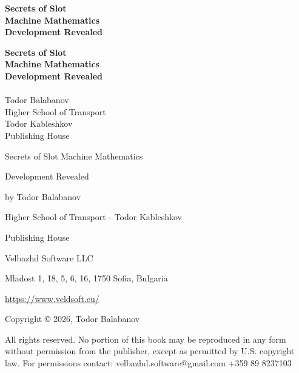 \documentclass[12pt,twoside,openany]{book}
\begin{document}
\sloppy

\frontmatter

\thispagestyle{empty}
\begin{center} \vspace*{2in} \Huge\textbf{Secrets of Slot\\ Machine Mathematics\\ Development Revealed}\\ \vspace*{0.25in} \Large\textit{} \end{center}
\clearpage

\thispagestyle{empty}
\begin{center}
    \vspace*{1in}
    \Huge\textbf{Secrets of Slot\\ Machine Mathematics\\ Development Revealed} \\
    \vspace*{0.25in} \Large\textit{} \\
    \vfill
    \Large Todor Balabanov \\
    \vspace*{0.25in} \small Higher School of Transport\\ Todor Kableshkov\\ Publishing House
\end{center}
\clearpage

\thispagestyle{empty}
\vspace*{0.5in}
Secrets of Slot Machine Mathematics

Development Revealed

by Todor Balabanov

\vspace*{0.25in}
Higher School of Transport - Todor Kableshkov

Publishing House

\vspace*{0.25in}
Velbazhd Software LLC

Mladost 1, 18, 5, 6, 16, 1750 Sofia, Bulgaria

\url{https://www.veldsoft.eu/}

\vspace*{0.25in}
Copyright © 2026, Todor Balabanov

\vspace*{0.25in}
All rights reserved. No portion of this book may be reproduced in any form without permission from the publisher, except as permitted by U.S. copyright law. For permissions contact: velbazhd.software@gmail.com +359 89 8237103
\end{document}
